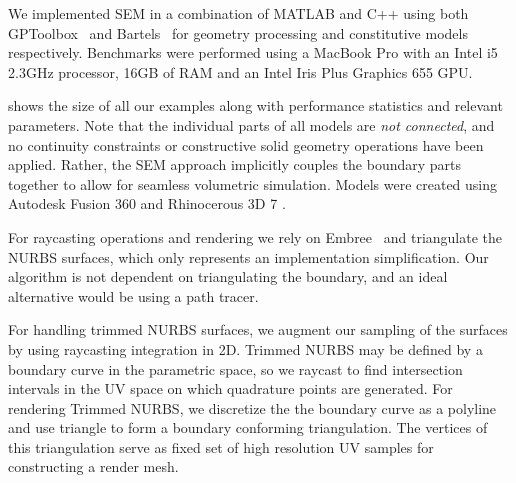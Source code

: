


We implemented SEM in a combination of MATLAB and C++ using both GPToolbox~\cite{gptoolbox} and Bartels~\cite{bartels} for geometry processing and constitutive models 
respectively. Benchmarks were performed using a MacBook Pro with an Intel i5 2.3GHz processor, 16GB of RAM and an Intel Iris Plus Graphics 655 GPU.

 shows the size of all our examples along with performance statistics and relevant parameters.
Note that the individual parts of all models are \emph{not connected}, and no continuity constraints or constructive solid geometry operations have been applied. 
Rather, the SEM approach implicitly couples the boundary parts together to allow for seamless volumetric simulation. 
Models were created using Autodesk Fusion 360 \cite{AutodeskFusion360} and Rhinocerous 3D 7 \cite{mcneel-rhinoceros}.
  
For raycasting operations and rendering we rely on Embree~\cite{10.1145/2601097.2601199} and triangulate the NURBS surfaces, which only represents an implementation simplification. 
Our algorithm is not dependent on triangulating the boundary, and an ideal alternative would be using a path tracer.

For handling trimmed NURBS surfaces, we augment our sampling of the surfaces by using raycasting integration in 2D. Trimmed NURBS may be defined by a boundary curve in the parametric space, so we raycast to find intersection intervals in the UV space on which quadrature points are generated. For rendering Trimmed NURBS, we discretize the the boundary curve as a polyline and use triangle \cite{shewchuk96b, SHEWCHUK200221} to form a boundary conforming triangulation. The vertices of this triangulation serve as fixed set of high resolution UV samples for constructing a render mesh.


